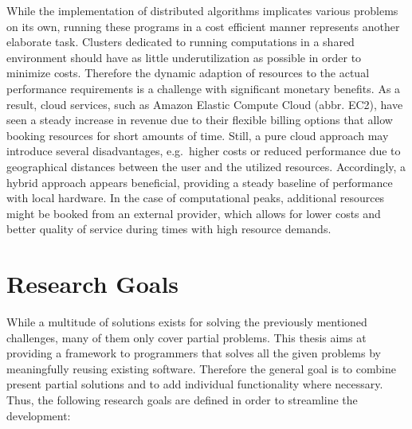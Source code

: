 While the implementation of distributed algorithms implicates various problems on its own, running these programs in a cost efficient manner represents another elaborate task. Clusters dedicated to running computations in a shared environment should have as little underutilization as possible in order to minimize costs. Therefore the dynamic adaption of resources to the actual performance requirements is a challenge with significant monetary benefits. As a result, cloud services, such as Amazon Elastic Compute Cloud (abbr. EC2), have seen a steady increase in revenue due to their flexible billing options that allow booking resources for short amounts of time\cite{gartner_2017}. Still, a pure cloud approach may introduce several disadvantages, e.g.~higher costs or reduced performance due to geographical distances between the user and the utilized resources. Accordingly, a hybrid approach appears beneficial, providing a steady baseline of performance with local hardware. In the case of computational peaks, additional resources might be booked from an external provider, which allows for lower costs and better quality of service during times with high resource demands.

\section*{Research Goals}
\label{goals}
While a multitude of solutions exists for solving the previously mentioned challenges, many of them only cover partial problems. This thesis aims at providing a framework to programmers that solves all the given problems by meaningfully reusing existing software. Therefore the general goal is to combine present partial solutions and to add individual functionality where necessary. Thus, the following research goals are defined in order to streamline the development:

